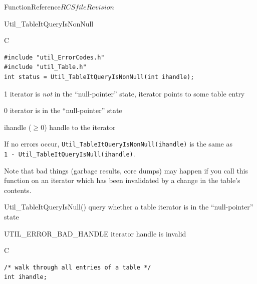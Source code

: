 \begin{cactuspart}{FunctionReference}{$RCSfile$}{$Revision$}
\begin{FunctionDescription}{Util\_TableItQueryIsNonNull}
\begin{SynopsisSection}
\begin{Synopsis}{C}
\begin{verbatim}
#include "util_ErrorCodes.h"
#include "util_Table.h"
int status = Util_TableItQueryIsNonNull(int ihandle);
\end{verbatim}
\end{Synopsis}
\end{SynopsisSection}

\begin{ResultSection}
\begin{Result}{\rm 1}
iterator is {\em not\/} in the ``null-pointer'' state,
\ie{} iterator points to some table entry
\end{Result}
\begin{Result}{\rm 0}
iterator is in the ``null-pointer'' state
\end{Result}
\end{ResultSection}

\begin{ParameterSection}
\begin{Parameter}{ihandle ($\ge 0$)}
handle to the iterator
\end{Parameter}
\end{ParameterSection}

\begin{Discussion}
If no errors occur,
\verb|Util_TableItQueryIsNonNull(ihandle)|
is the same as\\
\verb|1 - Util_TableItQueryIsNull(ihandle)|.

Note that bad things (garbage results, core dumps) may happen if
you call this function on an iterator which has been invalidated
by a change in the table's contents.
\end{Discussion}

\begin{SeeAlsoSection}
\begin{SeeAlso}{Util\_TableItQueryIsNull()}
query whether a table iterator is in the ``null-pointer'' state
\end{SeeAlso}
\end{SeeAlsoSection}

\begin{ErrorSection}
\begin{Error}{UTIL\_ERROR\_BAD\_HANDLE}
iterator handle is invalid
\end{Error}
\end{ErrorSection}

\begin{ExampleSection}
\begin{Example}{C}
\begin{verbatim}
/* walk through all entries of a table */
int ihandle;


\end{verbatim}
\end{Example}
\end{ExampleSection}
\end{FunctionDescription}
\end{cactuspart}
